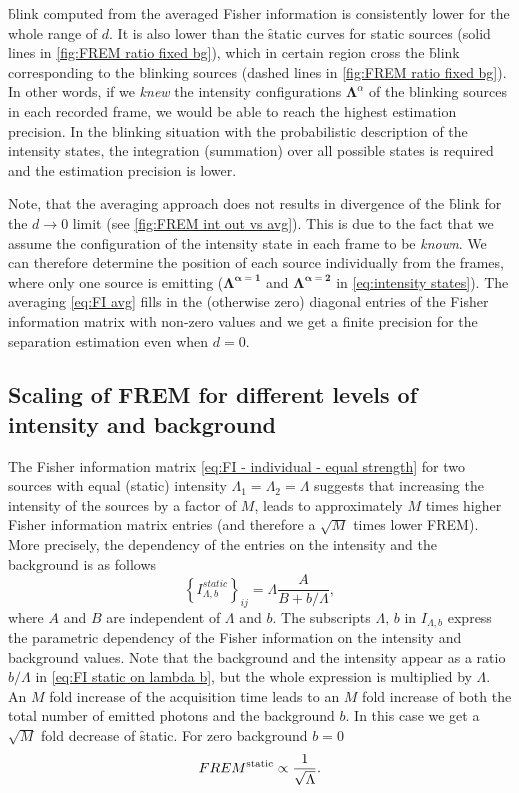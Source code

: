 \f{blink} computed from the averaged Fisher information is consistently lower for the whole range of $d$. It is also lower than the \f{static} curves for static sources (solid lines in \autoref{fig:FREM ratio fixed bg}), which in certain region cross the \f{blink} corresponding to the blinking sources (dashed lines in \autoref{fig:FREM ratio fixed bg}). In other words, if we {\it knew} the intensity configurations $\bm{\Lambda}^{\alpha}$ of the blinking sources in each recorded frame, we would be able to reach the highest estimation precision. In the blinking situation with the probabilistic description of the intensity states, the integration (summation) over all possible states is required and the estimation precision is lower. 

Note, that the averaging approach does not results in divergence of the \f{blink} for the $d\rightarrow 0$ limit (see \autoref{fig:FREM int out vs avg}\aaa). This is due to the fact that we assume the configuration of the intensity state in each frame to be {\it known}. We can therefore determine the position of each source individually from the frames, where only one source is emitting ($\bm{\Lambda^{\alpha=1}}$ and $\bm{\Lambda^{\alpha=2}}$ in \autoref{eq:intensity states}). The averaging \autoref{eq:FI avg} fills in the (otherwise zero) diagonal entries of the Fisher information matrix with non-zero values and we get a finite precision for the separation estimation even when $d=0$.


\subsection{Scaling of FREM for different levels of intensity and background\label{sub:scaling}}

The Fisher information matrix \autoref{eq:FI - individual - equal strength} for two sources with equal (static) intensity $\Lambda_1=\Lambda_2=\Lambda$ suggests that increasing the intensity of the sources by a factor of $M$, leads to approximately $M$ times higher Fisher information matrix entries (and therefore a $\sqrt{M}$ times lower FREM). More precisely, the dependency of the entries on the intensity and the background is as follows
%
\begin{equation}
	\left\{I_{\Lambda,b}^{static}\right\}_{ij}=\Lambda\frac{A}{B+b/\Lambda},
	\label{eq:FI static on lambda b}
\end{equation}
%
where $A$ and $B$ are independent of $\Lambda$ and $b$. The subscripts $\Lambda,\,b$ in $I_{\Lambda,b}$ express the parametric dependency of the Fisher information on the intensity and background values.  Note that the background and the intensity appear as a ratio $b/\Lambda$ in \autoref{eq:FI static on lambda b}, but the whole expression is multiplied by $\Lambda$. An $M$ fold increase of the acquisition time leads to an $M$ fold increase of both the total number of emitted photons and the background $b$. In this case we get a $\sqrt{M}$ fold decrease of \f{static}. For zero background $b=0$ 
%
\begin{equation}
	FREM^{\textrm{static}}\propto\frac{1}{\sqrt{\Lambda}}.
\end{equation}

